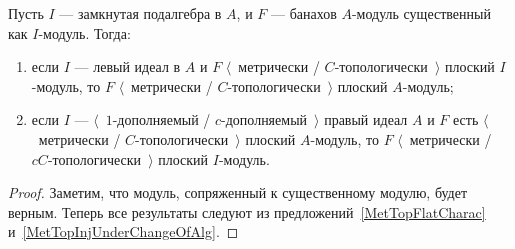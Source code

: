 \begin{proposition}\label{MetTopFlatUnderChangeOfAlg} Пусть $I$ --- замкнутая
подалгебра в $A$, и $F$ --- банахов $A$-модуль существенный как $I$-модуль.
Тогда:
\begin{enumerate}[label = (\roman*)]
    \item если $I$ --- левый идеал в $A$ и $F$ $\langle$~метрически /
    $C$-топологически~$\rangle$ плоский $I$-модуль, то $F$ $\langle$~метрически
    / $C$-топологически~$\rangle$ плоский $A$-модуль;

    \item если $I$ --- $\langle$~$1$-дополняемый / $c$-дополняемый~$\rangle$
    правый идеал $A$ и $F$ есть $\langle$~метрически /
    $C$-топологически~$\rangle$ плоский $A$-модуль, то $F$ $\langle$~метрически
    / $cC$-топологически~$\rangle$ плоский $I$-модуль.
\end{enumerate}
\end{proposition}
\begin{proof} Заметим, что модуль, сопряженный к существенному модулю, будет
верным. Теперь все результаты следуют из предложений~\ref{MetTopFlatCharac}
и~\ref{MetTopInjUnderChangeOfAlg}.
\end{proof}

